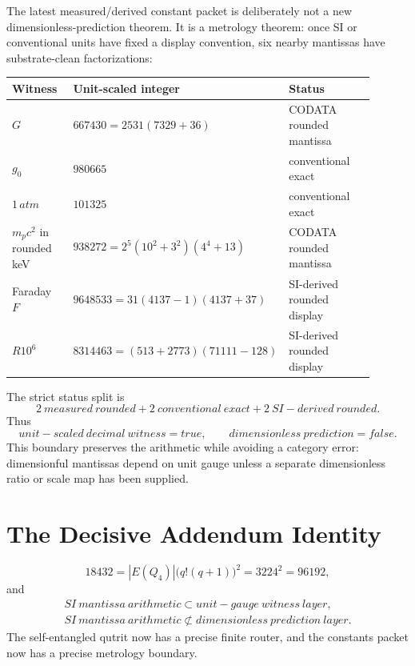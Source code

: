 \documentclass[12pt,a4paper]{article}
\def\mathrm#1{#1}%
\def\cdot{ }%
\theoremstyle{definition}
\begin{document}
The latest measured/derived constant packet is deliberately not a new
dimensionless-prediction theorem.  It is a metrology theorem: once SI or
conventional units have fixed a display convention, six nearby mantissas have
substrate-clean factorizations:
\begin{center}\scriptsize
\renewcommand{\arraystretch}{1.2}
\setlength{\tabcolsep}{3pt}
\begin{tabular}{>{\raggedright\arraybackslash}p{0.18\linewidth}
                >{\raggedright\arraybackslash}p{0.45\linewidth}
                >{\raggedright\arraybackslash}p{0.27\linewidth}}
\toprule
Witness & Unit-scaled integer & Status \\
\midrule
$G$ & $667430=2\cdot5\cdot31(73\cdot29+36)$ & CODATA rounded mantissa \\
$g_0$ & $980665$ & conventional exact \\
$1\,\mathrm{atm}$ & $101325$ & conventional exact \\
$m_pc^2$ in rounded keV & $938272=2^5(10^2+3^2)(4^4+13)$ & CODATA rounded mantissa \\
Faraday $F$ & $9648533=31(4\cdot137-1)(4\cdot137+3\cdot7)$ & SI-derived rounded display \\
$R\cdot10^6$ & $8314463=(5\cdot13+2\cdot7\cdot73)(7\cdot1111-128)$ & SI-derived rounded display \\
\bottomrule
\end{tabular}
\end{center}
The strict status split is
\[
  2\ \mathrm{measured\ rounded}
  +2\ \mathrm{conventional\ exact}
  +2\ \mathrm{SI\!-\!derived\ rounded}.
\]
Thus
\[
  \mathrm{unit\!-\!scaled\ decimal\ witness}=\mathrm{true},\qquad
  \mathrm{dimensionless\ prediction}=\mathrm{false}.
\]
This boundary preserves the arithmetic while avoiding a category error:
dimensionful mantissas depend on unit gauge unless a separate dimensionless
ratio or scale map has been supplied.

\section*{The Decisive Addendum Identity}

\[
\boxed{\;
18432
=|E(Q_4)|\cdot\big(q!(q+1)\big)^2
=32\cdot24^2
=96\cdot192,
\;}
\]
and
\[
\boxed{\;
\begin{gathered}
\mathrm{SI\ mantissa\ arithmetic}
\subset
\mathrm{unit\!-\!gauge\ witness\ layer},\\
\mathrm{SI\ mantissa\ arithmetic}
\not\subset
\mathrm{dimensionless\ prediction\ layer}.
\end{gathered}
\;}
\]
The self-entangled qutrit now has a precise finite router, and the constants
packet now has a precise metrology boundary.
\end{document}
